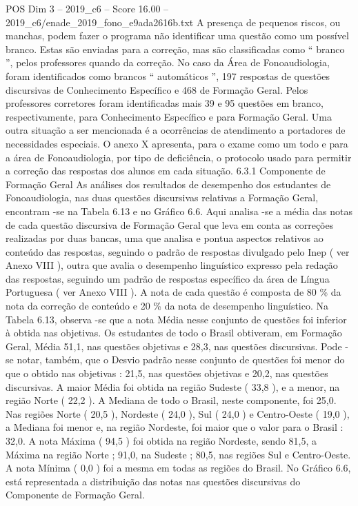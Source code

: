 \begin{textsample}{POS Dim 3 – 2019\_c6 – Score 16.00 – 2019\_c6/enade\_2019\_fono\_e9ada2616b.txt}
A presença de pequenos riscos, ou manchas, podem fazer o programa não identificar uma questão como um possível branco.
Estas são enviadas para a correção, mas são classificadas como “ branco ”, pelos professores quando da correção.
No caso da Área de Fonoaudiologia, foram identificados como brancos “ automáticos ”, 197 respostas de questões discursivas de Conhecimento Específico e 468 de Formação Geral.
Pelos professores corretores foram identificadas mais 39 e 95 questões em branco, respectivamente, para Conhecimento Específico e para Formação Geral.
Uma outra situação a ser mencionada é a ocorrências de atendimento a portadores de necessidades especiais.
O anexo X apresenta, para o exame como um todo e para a área de Fonoaudiologia, por tipo de deficiência, o protocolo usado para permitir a correção das respostas dos alunos em cada situação. 6.3.1 Componente de Formação Geral As análises dos resultados de desempenho dos estudantes de Fonoaudiologia, nas duas questões discursivas relativas a Formação Geral, encontram -se na Tabela 6.13 e no Gráfico 6.6.
Aqui analisa -se a média das notas de cada questão discursiva de Formação Geral que leva em conta as correções realizadas por duas bancas, uma que analisa e pontua aspectos relativos ao conteúdo das respostas, seguindo o padrão de respostas divulgado pelo Inep ( ver Anexo VIII ), outra que avalia o desempenho linguístico expresso pela redação das respostas, seguindo um padrão de respostas específico da área de Língua Portuguesa ( ver Anexo VIII ).
A nota de cada questão é composta de 80 \% da nota da correção de conteúdo e 20 \% da nota de desempenho linguístico.
Na Tabela 6.13, observa -se que a nota Média nesse conjunto de questões foi inferior à obtida nas objetivas.
Os estudantes de todo o Brasil obtiveram, em Formação Geral, Média 51,1, nas questões objetivas e 28,3, nas questões discursivas.
Pode -se notar, também, que o Desvio padrão nesse conjunto de questões foi menor do que o obtido nas objetivas : 21,5, nas questões objetivas e 20,2, nas questões discursivas.
A maior Média foi obtida na região Sudeste ( 33,8 ), e a menor, na região Norte ( 22,2 ).
A Mediana de todo o Brasil, neste componente, foi 25,0.
Nas regiões Norte ( 20,5 ), Nordeste ( 24,0 ), Sul ( 24,0 ) e Centro-Oeste ( 19,0 ), a Mediana foi menor e, na região Nordeste, foi maior que o valor para o Brasil : 32,0.
A nota Máxima ( 94,5 ) foi obtida na região Nordeste, sendo 81,5, a Máxima na região Norte ; 91,0, na Sudeste ; 80,5, nas regiões Sul e Centro-Oeste.
A nota Mínima ( 0,0 ) foi a mesma em todas as regiões do Brasil.
No Gráfico 6.6, está representada a distribuição das notas nas questões discursivas do Componente de Formação Geral.

\end{textsample}
